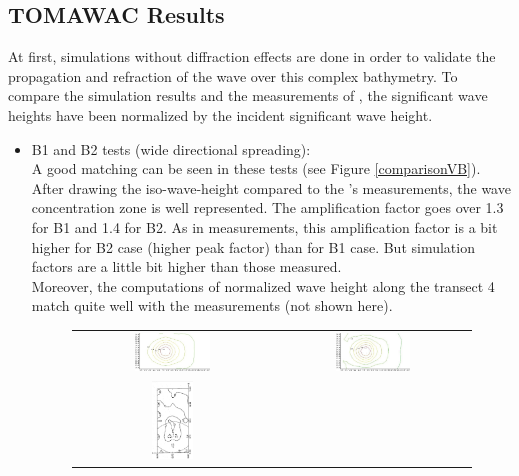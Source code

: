 \subsection{TOMAWAC Results }
At first, simulations without diffraction effects are done in order to validate the propagation and refraction of the wave over this complex bathymetry. To compare the simulation results and the measurements of \cite{Vincent1989}, the significant wave heights have been normalized by the incident significant wave height.\\
\begin{itemize}
\item B1 and B2 tests (wide directional spreading):\\
A good matching can be seen in these tests (see Figure \ref{comparisonVB}). After drawing the iso-wave-height compared to the \cite{Vincent1989}'s measurements, the wave concentration zone is well represented. The amplification factor goes over 1.3 for B1 and 1.4 for B2. As in measurements, this amplification factor is a bit higher for B2 case (higher peak factor) than for B1 case. But simulation factors are a little bit higher than those measured.\\
Moreover, the computations of normalized wave height along the transect 4 match quite well with the measurements (not shown here).\\
\begin{figure}[H]
  \centering
  \begin{tabular}{cc}
  	\includegraphics[width=0.4\textwidth]{iso-B1.jpg}&\includegraphics[width=0.4\textwidth]{iso-B2.jpg}\\
  	\includegraphics[width=0.22\textwidth,angle=-90]{B1_m.JPG}

\end{tabular}
\end{figure}
\end{itemize}
